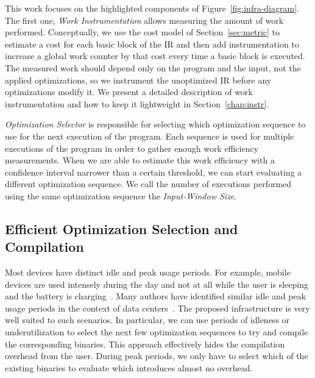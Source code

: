 This work focuses on the highlighted components of Figure~\ref{fig:infra-diagram}. The first one, \textit{Work Instrumentation} allows
measuring the amount of work performed. Conceptually, we use the cost model of Section~\ref{sec:metric} to estimate a cost for each basic
block of the IR and then add instrumentation to increase a global work counter by that cost every time a basic block is executed. The
measured work should depend only on the program and the input, not the applied optimizations, so we instrument the unoptimized IR before
any optimizations modify it. We present a detailed description of work instrumentation and how to keep it lightweight in
Section~\ref{chap:instr}.

\textit{Optimization Selector} is responsible for selecting which optimization sequence to use for the next execution of the program. Each
sequence is used for multiple executions of the program in order to gather enough work efficiency measurements. When we are able to
estimate this work efficiency with a confidence interval narrower than a certain threshold, we can start evaluating a different
optimization sequence. We call the number of executions performed using the same optimization sequence the \textit{Input-Window Size}.


\subsection{Efficient Optimization Selection and Compilation}

Most devices have distinct idle and peak usage periods. For example, mobile devices are used intensely during the day and not at all while
the user is sleeping and the battery is charging~\citep{mpeis16}. Many authors have identified similar idle and peak usage periods in the
context of data centers~\citep{armbrust10,chen12b}. The proposed \itercomp infrastructure is very well suited to such scenarios. In
particular, we can use periods of idleness or underutilization to select the next few optimization sequences to try and compile the
corresponding binaries. This approach effectively hides the compilation overhead from the user. During peak periods, we only have to select
which of the existing binaries to evaluate which introduces almost no overhead.
